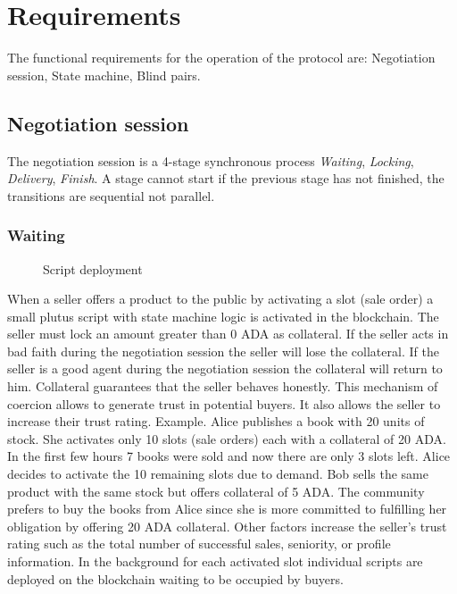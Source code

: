 \documentclass[12pt]{article}
\begin{document}
\section{ Requirements }

The functional requirements for the operation of the protocol are: Negotiation session, State machine, Blind pairs.

\subsection { Negotiation session }

The negotiation session is a 4-stage synchronous process \emph{Waiting}, \emph{Locking}, \emph{Delivery}, \emph{Finish}. A stage cannot start if the previous stage has not finished, the transitions are sequential not parallel.

\subsubsection { Waiting }

\begin{figure}[ht]
  \centering
  
  \caption{Script deployment}
  \label{fig:mi_imagen}
\end{figure}


When a seller offers a product to the public by activating a slot (sale order) a small plutus script with state machine logic is activated in the blockchain.
The seller must lock an amount greater than 0 ADA as collateral. 
If the seller acts in bad faith during the negotiation session the seller will lose the collateral.
If the seller is a good agent during the negotiation session the collateral will return to him.
Collateral guarantees that the seller behaves honestly.
This mechanism of coercion allows to generate trust in potential buyers. 
It also allows the seller to increase their trust rating. Example. Alice publishes a book with 20 units of stock.
She activates only 10 slots (sale orders) each with a collateral of 20 ADA.
In the first few hours 7 books were sold and now there are only 3 slots left.
Alice decides to activate the 10 remaining slots due to demand.
Bob sells the same product with the same stock but offers collateral of 5 ADA. The community prefers to buy the books from Alice since she is more committed to fulfilling her obligation by offering 20 ADA collateral.
Other factors increase the seller's trust rating such as the total number of successful sales, seniority, or profile information.
In the background for each activated slot individual scripts are deployed on the blockchain waiting to be occupied by buyers.
\end{document}
